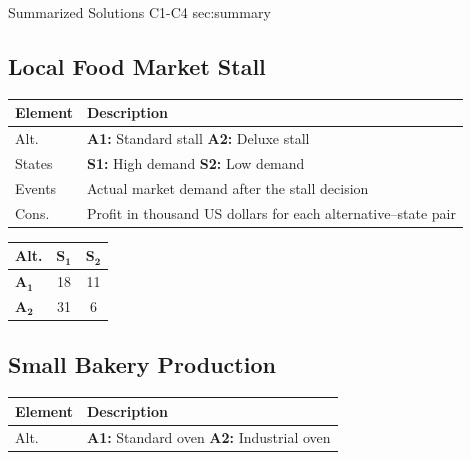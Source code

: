 	\sectionScored
	{Summarized Solutions}
	{C1-C4}
	{sec:summary}
	{
	\subsection{Local Food Market Stall}
		\begin{center}
			\begin{minipage}[t]{0.6\textwidth}
				\begin{tabularx}{\textwidth}
					{@{}p{1.5cm}>{\raggedright\arraybackslash}X@{}}
					\toprule
					Element & Description \\
					\midrule
					Alt. &
					\textbf{A1:} Standard stall \quad
					\textbf{A2:} Deluxe stall \\
					
					States &
					\textbf{S1:} High demand \quad
					\textbf{S2:} Low demand \\
					
					Events &
					Actual market demand after the stall decision \\
					
					Cons. &
					Profit in thousand US dollars for each alternative--state pair \\
					\bottomrule
				\end{tabularx}
			\end{minipage}
			\hfill
			\begin{minipage}[t]{0.35\textwidth}
				\begin{center}
					\begin{tabular}{lcc}
						\toprule
						Alt. &  \(\mathbf{S_1}\) & \(\mathbf{S_2}\)\\
						\midrule
						\( \mathbf{A_1}\) & 18 & 11\\
						\(\mathbf{A_2}\) & 31 & 6\\
						\bottomrule
					\end{tabular}
				\end{center}
			\end{minipage}
		\end{center}
	
	\subsection{Small Bakery Production}
	\begin{center}
		\begin{minipage}[t]{0.55\textwidth}
			\begin{tabularx}{\textwidth}{
					@{}p{1.5cm}>{\raggedright\arraybackslash}X@{}
				}
				\toprule
				Element & Description \\
				\midrule
				Alt. &
				\textbf{A1:} Standard oven \quad
				\textbf{A2:} Industrial oven \\
				

\end{tabularx}
\end{minipage}
\end{center}}

